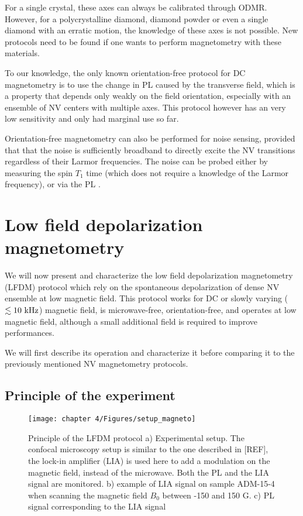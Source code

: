 \documentclass[a4paper,11pt]{report}
\begin{document}
\begin{refsection}
For a single crystal, these axes can always be calibrated through ODMR. However, for a polycrystalline diamond, diamond powder or even a single diamond with an erratic motion, the knowledge of these axes is not possible. New protocols need to be found if one wants to perform magnetometry with these materials.

To our knowledge, the only known orientation-free protocol for DC magnetometry is to use the change in PL caused by the transverse field, which is a property that depends only weakly on the field orientation, especially with an ensemble of NV centers with multiple axes. This protocol however has an very low sensitivity and only had marginal use so far\citep{rondin2012nanoscale, tetienne2012magnetic, maletinsky2012robust, chapman2013background, jones2020selective}.

Orientation-free magnetometry can also be performed for noise sensing, provided that that the noise is sufficiently broadband to directly excite the NV transitions regardless of their Larmor frequencies. The noise can be probed either by measuring the spin $T_1$ time \citep{kolkowitz2015probing, andersen2019electron} (which does not require a knowledge of the Larmor frequency), or via the PL \citep{finco2021imaging}.

\section{Low field depolarization magnetometry}
\label{sec LFDM}
We will now present and characterize the low field depolarization magnetometry (LFDM) protocol which rely on the spontaneous depolarization of dense NV ensemble at low magnetic field. This protocol works for DC or slowly varying ($\lesssim 10\ \rm kHz$) magnetic field, is microwave-free, orientation-free, and operates at low magnetic field, although a small additional field is required to improve performances.

We will first describe its operation and characterize it before comparing it to the previously mentioned NV magnetometry protocols.

\subsection{Principle of the experiment}

\begin{figure}[h!]
\centering
\texttt{[image: chapter 4/Figures/setup\_magneto]}
\caption{Principle of the LFDM protocol a) Experimental setup. The confocal microscopy setup is similar to the one described in [REF], the lock-in amplifier (LIA) is used here to add a modulation on the magnetic field, instead of the microwave. Both the PL and the LIA signal are monitored. b) example of LIA signal on sample ADM-15-4 when scanning the magnetic field $B_0$ between -150 and 150 G. c) PL signal corresponding to the LIA signal}
\label{setup magneto}
\end{figure}


\end{refsection}
\end{document}
